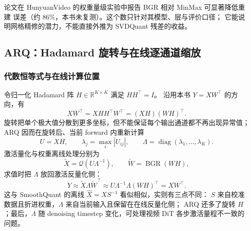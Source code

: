 论文在 HunyuanVideo 的权重量级实验中报告 BGR 相对 MinMax 可显著降低重建
误差（约 $86\%$，本书未复测）。这个数只针对其模型、层与评价口径；
它能说明网格精修的潜力，不能直接外推为 SVDQuant 残差的收益。

\subsection{ARQ：Hadamard 旋转与在线逐通道缩放}

\subsubsection{代数恒等式与在线计算位置}

令归一化 Hadamard 阵 $H\in\mathbb R^{K\times K}$ 满足 $HH^{\top}=I$。
沿用本书 $Y=XW^{\top}$ 的方向，有
\begin{equation}
  XW^{\top}=XHH^{\top}W^{\top}=(XH)(WH)^{\top}.
  \label{eq:38-dvd-arq-equiv}
\end{equation}
旋转把单个极大值分散到更多坐标，但不能保证每个输出通道都不再出现异常值；
ARQ 因而在旋转后、当前 forward 内重新计算
\begin{equation}
  U=XH,\qquad
  \lambda_j=\max_i|U_{ij}|,\qquad
  \Lambda=\operatorname{diag}(\lambda_1,\ldots,\lambda_K).
  \label{eq:38-dvd-arq-lambda}
\end{equation}
激活量化与权重离线处理分别为
\begin{equation}
  \widetilde X=\mathcal Q(U\Lambda^{-1}),\qquad
  \widetilde W=\operatorname{BGR}(WH),
  \label{eq:38-dvd-arq-quant}
\end{equation}
求值时把 $\Lambda$ 放回激活反量化侧：
\begin{equation}
  Y\approx\widetilde X\Lambda\widetilde W^{\top}
  \approx U\Lambda^{-1}\Lambda(WH)^{\top}
  =XW^{\top}.
  \label{eq:38-dvd-arq-output}
\end{equation}
这与 SmoothQuant 的离线 $\widehat X=XS^{-1}$ 看似相似，实则有三点不同：
$S$ 来自校准数据且折进权重，$\Lambda$ 来自当前输入且保留在在线反量化侧；
ARQ 还多了旋转 $H$；最后，$\Lambda$ 随 denoising timestep 变化，可处理视频
DiT 各步激活量程不一致的问题。

